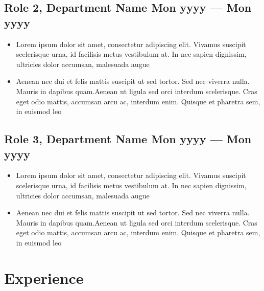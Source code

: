 \documentclass[a4,10pt]{article}
\newenvironment{zitemize}{
\begin{itemize}\itemsep0pt \parskip0pt \parsep1pt}
{\end{itemize}\vspace{-0.5cm}}
\begin{document}
\subsection*{Role 2, {\normalsize\normalfont Department Name} \hfill Mon yyyy --- Mon yyyy} 
    \begin{zitemize}
        \item Lorem ipsum dolor sit amet, consectetur adipiscing elit. Vivamus suscipit scelerisque urna, id facilisis metus vestibulum at. In nec sapien dignissim, ultricies dolor accumsan, malesuada augue 
        \item Aenean nec dui et felis mattis suscipit ut sed tortor. Sed nec viverra nulla. Mauris in dapibus quam.Aenean ut ligula sed orci interdum scelerisque. Cras eget odio mattis, accumsan arcu ac, interdum enim. Quisque et pharetra sem, in euismod leo 
    \end{zitemize}


\subsection*{Role 3, {\normalsize\normalfont Department Name} \hfill Mon yyyy --- Mon yyyy} 
    \begin{zitemize}
        \item Lorem ipsum dolor sit amet, consectetur adipiscing elit. Vivamus suscipit scelerisque urna, id facilisis metus vestibulum at. In nec sapien dignissim, ultricies dolor accumsan, malesuada augue 
        \item Aenean nec dui et felis mattis suscipit ut sed tortor. Sed nec viverra nulla. Mauris in dapibus quam.Aenean ut ligula sed orci interdum scelerisque. Cras eget odio mattis, accumsan arcu ac, interdum enim. Quisque et pharetra sem, in euismod leo 
    \end{zitemize}



\section{Experience}
\end{document}
